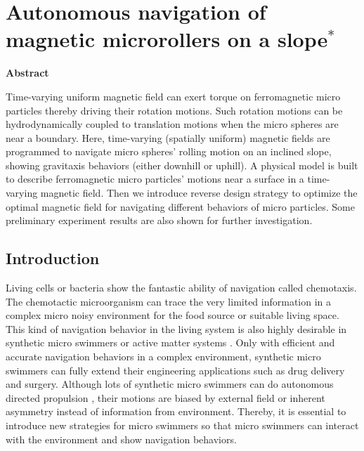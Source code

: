 \chapter{Autonomous navigation of magnetic microrollers on a slope$^{*}$} 
\begin{center}
\vspace*{1\baselineskip}
\textbf{Abstract}
\end{center}
Time-varying uniform magnetic field can exert torque on ferromagnetic micro particles thereby driving their rotation motions. Such rotation motions can be hydrodynamically coupled to translation motions when the micro spheres are near a boundary. Here, time-varying (spatially uniform) magnetic fields are  programmed to navigate micro spheres' rolling motion on an inclined slope, showing gravitaxis behaviors (either downhill or uphill). A physical model is  built  to describe ferromagnetic micro particles' motions near a surface in a time-varying magnetic field. Then we introduce reverse design strategy to optimize the optimal magnetic field for navigating different behaviors of micro particles. Some preliminary experiment results are also shown for further investigation. 
\section{Introduction}
Living cells or bacteria show the fantastic ability of navigation called chemotaxis\autocite{alon1999robustness,adler1975chemotaxis}. The chemotactic microorganism can trace the very limited information in  a complex micro noisy environment for the food source or suitable living space\autocite{keller1971model}. This kind of navigation behavior in the living system is also highly desirable in synthetic micro swimmers or active matter systems \autocite{patteson2016active}. Only with efficient and accurate navigation behaviors in a complex environment, synthetic micro swimmers can fully extend their engineering applications such as drug delivery and surgery\autocite{de2017micromotor,xu2018sperm}. Although lots of synthetic  micro swimmers can do autonomous directed propulsion \autocite{yan2016reconfiguring,lee2019directed,baker2019shape}, their motions are biased by  external field or inherent asymmetry instead of information from environment. Thereby, it is essential to introduce new strategies for micro swimmers so that micro swimmers can interact with the environment and show navigation behaviors.  

